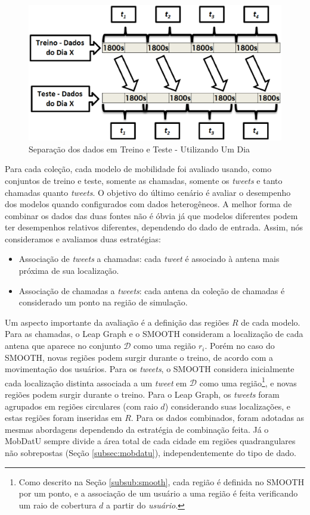 \documentclass[10pt, a4paper, onecolumn, conference, compsocconf]{IEEEtran}
\begin{document}
\begin{figure}[ttt!]
\centering
\includegraphics[width=0.5\linewidth]{Graficos/treinoteste1dia.eps}
\caption{Separação dos dados em Treino e Teste - Utilizando Um Dia}
\label{fig:treinotesteb}
\end{figure}

Para cada coleção, cada modelo de mobilidade foi avaliado usando, como conjuntos de treino e teste, somente  as chamadas, somente os \textit{tweets} e tanto chamadas quanto {\it tweets}. O objetivo do último cenário é avaliar o desempenho dos  modelos quando configurados com dados heterogêneos. A melhor forma de combinar  os dados das duas fontes não é óbvia já que modelos diferentes podem ter desempenhos relativos diferentes, dependendo do dado de entrada. Assim, nós consideramos e avaliamos duas estratégias: 

\begin{itemize}
	\item Associação de \textit{tweets} a chamadas: cada \textit{tweet} é associado à antena mais próxima de sua localização.
	\item Associação de chamadas a \textit{tweets}: cada antena da coleção de chamadas é considerado um ponto na região de simulação.   
\end{itemize}

Um aspecto importante da avaliação é a definição das regiões $R$ de cada modelo. Para as chamadas, o Leap Graph e o SMOOTH  consideram a localização de cada antena que aparece no conjunto $\mathcal{D}$ como uma região $r_{i}$. Porém no caso do SMOOTH,   novas regiões podem surgir durante o treino, de acordo com a movimentação dos usuários. Para os {\it tweets}, o SMOOTH considera inicialmente cada localização distinta associada a um  {\it tweet} em $\mathcal{D}$ como uma  região\footnote{Como descrito na Seção \ref{subsub:smooth}, cada região é definida no SMOOTH por um ponto, e a associação de um usuário a uma região é feita verificando um raio de cobertura $d$ a partir do {\it usuário}.},  e novas regiões podem surgir durante o treino. Para o Leap Graph,  os {\it tweets} foram agrupados em regiões circulares (com raio $d$) considerando suas localizações, e estas regiões foram inseridas em $R$. Para os dados combinados, foram adotadas as mesmas abordagens dependendo da estratégia de combinação feita. Já o MobDatU sempre divide a  área total de cada cidade em regiões quadrangulares não sobrepostas (Seção \ref{subsec:mobdatu}),  independentemente do tipo de dado.
\end{document}
